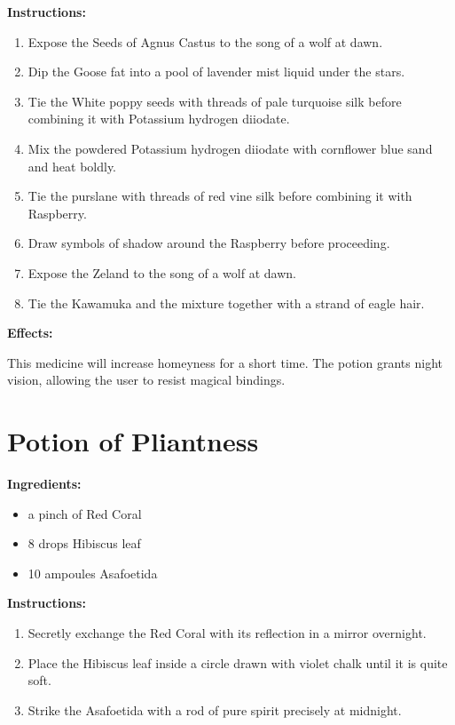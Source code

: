 \documentclass{article}
\begin{document}
\textbf{Instructions:}

\begin{enumerate}
  \item Expose the Seeds of Agnus Castus to the song of a wolf at dawn.
  \item Dip the Goose fat into a pool of lavender mist liquid under the stars.
  \item Tie the White poppy seeds with threads of pale turquoise silk before combining it with Potassium hydrogen diiodate.
  \item Mix the powdered Potassium hydrogen diiodate with cornflower blue sand and heat boldly.
  \item Tie the purslane with threads of red vine silk before combining it with Raspberry.
  \item Draw symbols of shadow around the Raspberry before proceeding.
  \item Expose the Zeland to the song of a wolf at dawn.
  \item Tie the Kawamuka and the mixture together with a strand of eagle hair.
\end{enumerate}

\textbf{Effects:}

This medicine will increase homeyness for a short time. The potion grants night vision, allowing the user to resist magical bindings.

\newpage
\section*{Potion of Pliantness}

\textbf{Ingredients:}

\begin{itemize}
  \item a pinch of Red Coral
  \item 8 drops Hibiscus leaf
  \item 10 ampoules Asafoetida
\end{itemize}

\textbf{Instructions:}

\begin{enumerate}
  \item Secretly exchange the Red Coral with its reflection in a mirror overnight.
  \item Place the Hibiscus leaf inside a circle drawn with violet chalk until it is quite soft.
  \item Strike the Asafoetida with a rod of pure spirit precisely at midnight.
\end{enumerate}
\end{document}
